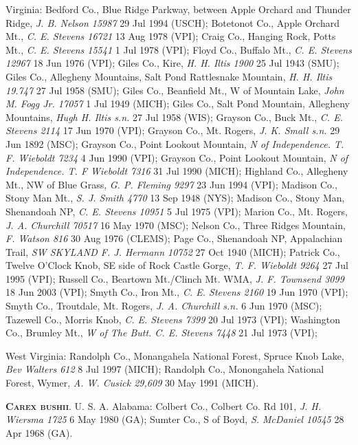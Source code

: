 \documentclass{article}
\begin{document}
Virginia:
Bedford Co., Blue Ridge Parkway, between Apple Orchard and Thunder Ridge, \textit{J. B. Nelson 15987} 29 Jul 1994 (USCH);
Botetonot Co., Apple Orchard Mt., \textit{C. E. Stevens 16721} 13 Aug 1978 (VPI);
Craig Co., Hanging Rock, Potts Mt., \textit{C. E. Stevens 15541} 1 Jul 1978 (VPI);
Floyd Co., Buffalo Mt., \textit{C. E. Stevens 12967} 18 Jun 1976 (VPI);
Giles Co., Kire, \textit{H. H. Iltis 1900} 25 Jul 1943 (SMU);
Giles Co., Allegheny Mountains, Salt Pond Rattlesnake Mountain, \textit{H. H. Iltis 19.747} 27 Jul 1958 (SMU);
Giles Co., Beanfield Mt., W of Mountain Lake, \textit{John M. Fogg Jr. 17057} 1 Jul 1949 (MICH);
Giles Co., Salt Pond Mountain, Allegheny Mountains, \textit{Hugh H. Iltis s.n.} 27 Jul 1958 (WIS);
Grayson Co., Buck Mt., \textit{C. E. Stevens 2114} 17 Jun 1970 (VPI);
Grayson Co., Mt. Rogers, \textit{J. K. Small s.n.} 29 Jun 1892 (MSC);
Grayson Co., Point Lookout Mountain, \textit{N of Independence. T. F. Wieboldt 7234} 4 Jun 1990 (VPI);
Grayson Co., Point Lookout Mountain, \textit{N of Independence. T. F Wieboldt 7316} 31 Jul 1990 (MICH);
Highland Co., Allegheny Mt., NW of Blue Grass, \textit{G. P. Fleming 9297} 23 Jun 1994 (VPI);
Madison Co., Stony Man Mt., \textit{S. J. Smith 4770} 13 Sep 1948 (NYS);
Madison Co., Stony Man, Shenandoah NP, \textit{C. E. Stevens 10951} 5 Jul 1975 (VPI);
Marion Co., Mt. Rogers, \textit{J. A. Churchill 70517} 16 May 1970 (MSC);
Nelson Co., Three Ridges Mountain, \textit{F. Watson 816} 30 Aug 1976 (CLEMS);
Page Co., Shenandoah NP, Appalachian Trail, \textit{SW SKYLAND F. J. Hermann 10752} 27 Oct 1940 (MICH);
Patrick Co., Twelve O'Clock Knob, SE side of Rock Castle Gorge, \textit{T. F. Wieboldt 9264} 27 Jul 1995 (VPI);
Russell Co., Beartown Mt./Clinch Mt. WMA, \textit{J. F. Townsend 3099} 18 Jun 2003 (VPI);
Smyth Co., Iron Mt., \textit{C. E. Stevens 2160} 19 Jun 1970 (VPI);
Smyth Co., Troutdale, Mt. Rogers, \textit{J. A. Churchill s.n.} 6 Jun 1970 (MSC);
Tazewell Co., Morris Knob, \textit{C. E. Stevens 7399} 20 Jul 1973 (VPI);
Washington Co., Brumley Mt., \textit{W of The Butt. C. E. Stevens 7448} 21 Jul 1973 (VPI);

West Virginia:
Randolph Co., Monangahela National Forest, Spruce Knob Lake, \textit{Bev Walters 612} 8 Jul 1997 (MICH);
Randolph Co., Monongahela National Forest, Wymer, \textit{A. W. Cusick 29,609} 30 May 1991 (MICH).

\textbf{\textsc{Carex bushii}}. U. S. A.
Alabama:
Colbert Co., Colbert Co. Rd 101, \textit{J. H. Wiersma 1725} 6 May 1980 (GA);
Sumter Co., S of Boyd, \textit{S. McDaniel 10545} 28 Apr 1968 (GA).
\end{document}
